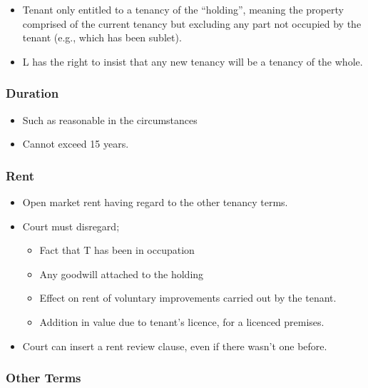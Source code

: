 \documentclass[
]{article}
\providecommand{\tightlist}{%
  \setlength{\itemsep}{0pt}\setlength{\parskip}{0pt}}
\begin{document}
\begin{itemize}
\tightlist
\item
  Tenant only entitled to a tenancy of the ``holding'', meaning the
  property comprised of the current tenancy but excluding any part not
  occupied by the tenant (e.g., which has been sublet).
\item
  L has the right to insist that any new tenancy will be a tenancy of
  the whole.
\end{itemize}

\hypertarget{duration}{%
\subsubsection{Duration}\label{duration}}

\begin{itemize}
\tightlist
\item
  Such as reasonable in the circumstances
\item
  Cannot exceed 15 years.
\end{itemize}

\hypertarget{rent}{%
\subsubsection{Rent}\label{rent}}

\begin{itemize}
\tightlist
\item
  Open market rent having regard to the other tenancy terms.
\item
  Court must disregard;

  \begin{itemize}
  \tightlist
  \item
    Fact that T has been in occupation
  \item
    Any goodwill attached to the holding
  \item
    Effect on rent of voluntary improvements carried out by the tenant.
  \item
    Addition in value due to tenant's licence, for a licenced premises.
  \end{itemize}
\item
  Court can insert a rent review clause, even if there wasn't one
  before.
\end{itemize}

\hypertarget{other-terms}{%
\subsubsection{Other Terms}\label{other-terms}}
\end{document}
